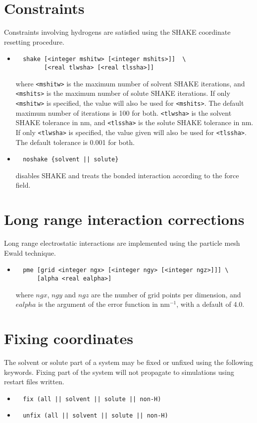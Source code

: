 \section{Constraints}
Constraints involving hydrogens are satisfied using the SHAKE 
coordinate resetting procedure.
\begin{itemize}
\item
\begin{verbatim}
  shake [<integer mshitw> [<integer mshits>]]  \
        [<real tlwsha> [<real tlssha>]]
\end{verbatim}
where \verb+<mshitw>+ is the maximum number of solvent SHAKE iterations,
and \verb+<mshits>+ is the maximum number of solute SHAKE iterations. If
only \verb+<mshitw>+ is specified, the value will also be used for \verb+<mshits>+.
The default maximum number of iterations is 100 for both.
\verb+<tlwsha>+ is the solvent SHAKE tolerance in nm, and \verb+<tlssha>+ is
the solute SHAKE tolerance in nm. If only \verb+<tlwsha>+ is specified, the
value given will also be used for \verb+<tlssha>+. The default tolerance
is 0.001 for both.
\item
\begin{verbatim}
  noshake {solvent || solute}
\end{verbatim}
disables SHAKE and treats the bonded interaction according to the
force field.
\end{itemize}

\section{Long range interaction corrections}
Long range electrostatic interactions are implemented using the
particle mesh Ewald technique.
\begin{itemize}
\item
\begin{verbatim}
  pme [grid <integer ngx> [<integer ngy> [<integer ngz>]]] \
      [alpha <real ealpha>]
\end{verbatim}
where $ngx$, $ngy$ and $ngz$ are the number of grid points per
dimension, and $ealpha$ is the argument of the error function in
nm$^{-1}$, with a default of 4.0.
\end{itemize}

\section{Fixing coordinates}
The solvent or solute part of a system may be fixed or unfixed using
the following keywords. Fixing part of the system will not propagate to
simulations using restart files written.
\begin{itemize}
\item
\begin{verbatim}
  fix (all || solvent || solute || non-H)
\end{verbatim}
\item
\begin{verbatim}
  unfix (all || solvent || solute || non-H)
\end{verbatim}
\end{itemize}

